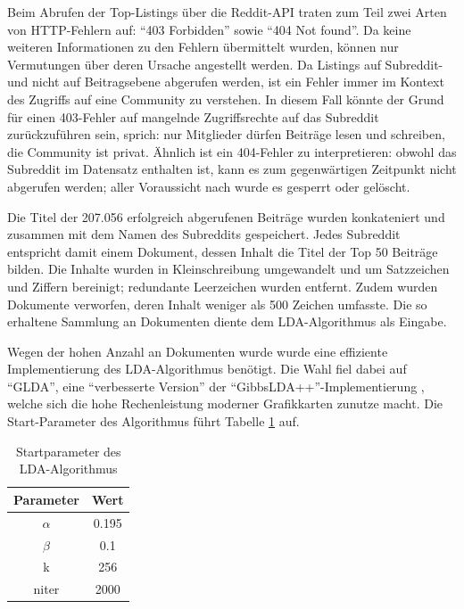\documentclass[11pt,a4paper,twoside]{article}
\begin{document}
Beim Abrufen der Top-Listings über die Reddit-API traten zum Teil zwei
Arten von HTTP-Fehlern auf: \enquote{403 Forbidden} sowie \enquote{404
Not found}. Da keine weiteren Informationen zu den Fehlern übermittelt
wurden, können nur Vermutungen über deren Ursache angestellt werden. Da
Listings auf Subreddit- und nicht auf Beitragsebene abgerufen werden,
ist ein Fehler immer im Kontext des Zugriffs auf eine Community zu
verstehen. In diesem Fall könnte der Grund für einen 403-Fehler auf
mangelnde Zugriffsrechte auf das Subreddit zurückzuführen sein, sprich:
nur Mitglieder dürfen Beiträge lesen und schreiben, die Community ist
privat. Ähnlich ist ein 404-Fehler zu interpretieren: obwohl das
Subreddit im Datensatz enthalten ist, kann es zum gegenwärtigen
Zeitpunkt nicht abgerufen werden; aller Voraussicht nach wurde es
gesperrt oder gelöscht.

Die Titel der 207.056 erfolgreich abgerufenen Beiträge wurden
konkateniert und zusammen mit dem Namen des Subreddits gespeichert.
Jedes Subreddit entspricht damit einem Dokument, dessen Inhalt die Titel
der Top 50 Beiträge bilden. Die Inhalte wurden in Kleinschreibung
umgewandelt und um Satzzeichen und Ziffern bereinigt; redundante
Leerzeichen wurden entfernt. Zudem wurden Dokumente verworfen, deren
Inhalt weniger als 500 Zeichen umfasste. Die so erhaltene Sammlung an
Dokumenten diente dem LDA-Algorithmus als Eingabe.

Wegen der hohen Anzahl an Dokumenten wurde wurde eine effiziente
Implementierung des LDA-Algorithmus benötigt. Die Wahl fiel dabei auf
\enquote{GLDA}, eine \enquote{verbesserte Version} \autocite{Lu2013} der
\enquote{GibbsLDA++}-Implementierung \autocite{Phan2007}, welche sich
die hohe Rechenleistung moderner Grafikkarten zunutze macht. Die
Start-Parameter des Algorithmus führt Tabelle \ref{tab:lda-params} auf.

\begin{table}

\caption{\label{tab:lda-params}Startparameter des LDA-Algorithmus}
\centering
\begin{tabular}[t]{cc}
\toprule
Parameter & Wert\\
\midrule
$\alpha$ & 0.195\\
$\beta$ & 0.1\\
k & 256\\
niter & 2000\\
\bottomrule
\end{tabular}
\end{table}
\end{document}
